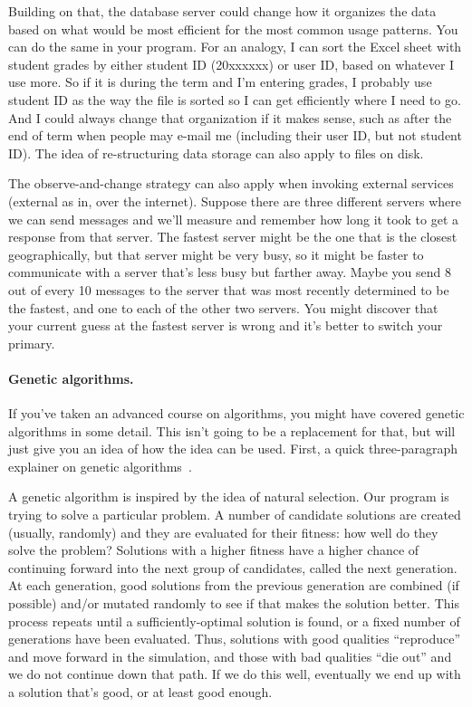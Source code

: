 \documentclass[a4paper]{report}
\begin{document}
Building on that, the database server could change how it organizes the data based on what would be most efficient for the most common usage patterns. You can do the same in your program. For an analogy, I can sort the Excel sheet with student grades by either student ID (20xxxxxx) or user ID, based on whatever I use more. So if it is during the term and I'm entering grades, I probably use student ID as the way the file is sorted so I can get efficiently where I need to go. And I could always change that organization if it makes sense, such as after the end of term when people may e-mail me (including their user ID, but not student ID). The idea of re-structuring data storage can also apply to files on disk.

The observe-and-change strategy can also apply when invoking external services (external as in, over the internet). Suppose there are three different servers where we can send messages and we'll measure and remember how long it took to get a response from that server. The fastest server might be the one that is the closest geographically, but that server might be very busy, so it might be faster to communicate with a server that's less busy but farther away. Maybe you send 8 out of every 10 messages to the server that was most recently determined to be the fastest, and one to each of the other two servers. You might discover that your current guess at the fastest server is wrong and it's better to switch your primary.


\paragraph{Genetic algorithms.}
If you've taken an advanced course on algorithms, you might have covered genetic algorithms in some detail. This isn't going to be a replacement for that, but will just give you an idea of how the idea can be used. First, a quick three-paragraph explainer on genetic algorithms~\cite{genetic}.

A genetic algorithm is inspired by the idea of natural selection. Our program is trying to solve a particular problem. A number of candidate solutions are created (usually, randomly) and they are evaluated for their fitness: how well do they solve the problem? Solutions with a higher fitness have a higher chance of continuing forward into the next group of candidates, called the next generation. At each generation, good solutions from the previous generation are combined (if possible) and/or mutated randomly to see if that makes the solution better. This process repeats until a sufficiently-optimal solution is found, or a fixed number of generations have been evaluated. Thus, solutions with good qualities ``reproduce'' and move forward in the simulation, and those with bad qualities ``die out'' and we do not continue down that path. If we do this well, eventually we end up with a solution that's good, or at least good enough.
\end{document}
